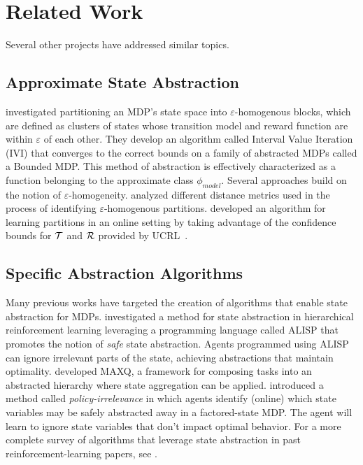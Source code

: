 \section{Related Work}

Several other projects have addressed similar topics.

\subsection{Approximate State Abstraction}
\citet{dean1997model} investigated partitioning an \ac{MDP}'s state space into $\varepsilon$-homogenous blocks, which are defined as clusters of states whose transition model and reward function are within $\varepsilon$ of each other. They develop an algorithm called Interval Value Iteration (IVI) that converges to the correct bounds on a family of abstracted MDPs called a Bounded MDP. This method of abstraction is effectively characterized as a function belonging to the approximate class $\phi_{model}$.
Several approaches build on the notion of $\varepsilon$-homogeneity. \citet{even2003approximate} analyzed different distance metrics used in the process of identifying $\varepsilon$-homogenous partitions. \citet{ortner2013adaptive} developed an algorithm for learning partitions in an online setting by taking advantage of the confidence bounds for $\mathcal{T}$ and $\mathcal{R}$ provided by UCRL~\cite{auer2009near}.

\subsection{Specific Abstraction Algorithms}
Many previous works have targeted the creation of algorithms that enable state abstraction for MDPs. \citet{andre2002state} investigated a method for state abstraction in hierarchical reinforcement learning leveraging a programming language called ALISP that promotes the notion of {\it safe} state abstraction. Agents programmed using ALISP can ignore irrelevant parts of the state, achieving abstractions that maintain optimality. \citet{dietterich2000hierarchical} developed MAXQ, a framework for composing tasks into an abstracted hierarchy where state aggregation can be applied. \citet{jong2005state} introduced a method called {\it policy-irrelevance} in which agents identify (online) which state variables may be safely abstracted away in a factored-state \ac{MDP}. The agent will learn to ignore state variables that don't impact optimal behavior. For a more complete survey of algorithms that leverage state abstraction in past reinforcement-learning papers, see \citet{li2006towards}.

